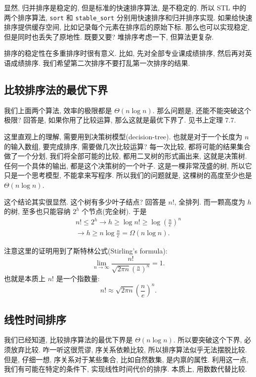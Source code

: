 \documentclass[a4paper]{ctexart}
\theoremstyle{definition}
\theoremstyle{definition}
\begin{document}
显然, 归并排序是稳定的, 但是标准的快速排序算法, 是不稳定的.
所以 STL 中的两个排序算法, \verb|sort| 和 \verb|stable_sort|
分别用快速排序和归并排序实现. 如果给快速排序提供缓存空间,
比如记录每个元素在排序后的原始下标. 那么也可以实现稳定,
但是同时也丢失了原地性. 既要又要? 堆排序考虑一下, 但算法更复杂. 

排序的稳定性在多重排序时很有意义. 比如, 先对全部专业课成绩排序,
然后再对英语成绩排序. 我们希望第二次排序不要打乱第一次排序的结果. 

\subsection{比较排序法的最优下界}
我们上面两个算法, 效率的极限都是 $\Theta(n \log n)$. 那么问题是,
还能不能突破这个极限? 回答是, 如果你用了比较运算, 那么这就是最优下界了.
见书上定理 7.7.

这里直观上的理解, 需要用到决策树模型(decision-tree).
也就是对于一个长度为 $n$ 的输入数组, 要完成排序, 需要做几次比较运算?
每一次比较, 都将可能的结果集合做了一个分划, 我们将全部可能的比较,
都用二叉树的形式画出来, 这就是决策树. 任何一个具体的输出, 都是这个决策树的一个叶子.
这是一棵非常茂盛的树, 所以它只是一个思考模型, 不能拿来写程序.
所以我们的问题就是, 这棵树的高度至少也是 $\Theta(n \log n)$.

这个结论其实很显然. 这个树有多少叶子结点? 回答是 $n!$, 全排列.
而一颗高度为 $h$ 的树, 至多也只能容纳 $2^h$ 个节点(完全树).
于是
$$
\begin{array}{r}
n! \leq 2^h \rightarrow h \geq \log n! \geq
\log\left(\frac{n}{e}\right)^n \\ \rightarrow h \geq n \log \frac{n}{e}
= \Omega(n\log n).
\end{array}
$$

注意这里的证明用到了斯特林公式(Stirling's formula):
$$
\lim_{n \to \infty} \frac{n!}{\sqrt{2 \pi n}
  \left(\frac{n}{}\right)^n} = 1.
$$
也就是本质上 $n!$ 是一个指数量:
$$
n! \approx \sqrt{2 \pi n}\left(\frac{n}{e}\right)^n.
$$


\subsection{线性时间排序}

我们已经知道, 比较排序算法的最优下界是 $\Theta(n \log n)$.
所以要突破这个下界, 必须放弃比较. 咋一听这很荒谬, 序关系依赖比较,
所以排序算法似乎无法摆脱比较. 但是, 仔细一想, 序关系对于某些集合, 比如自然数集,
是内禀的属性. 利用这一点, 我们有可能在特定的条件下, 实现线性时间代价的排序.
本质上, 用数数代替比较. 
\end{document}
